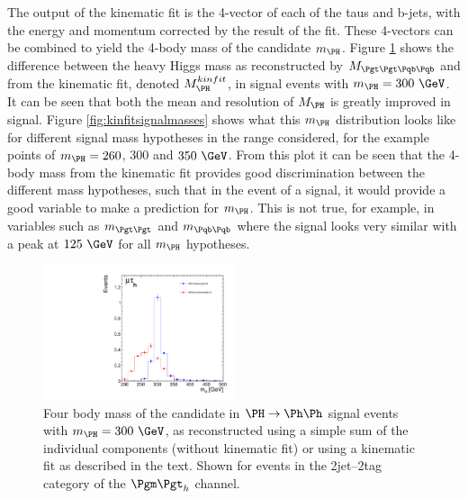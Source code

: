 The output of the kinematic fit is the 4-vector of each of the taus and b-jets,
with the energy and momentum corrected by the result of the fit. These 4-vectors
can be combined to yield the 4-body mass of the candidate $m_{\PH}$. Figure
\ref{fig:kinfitvsmttbb}
shows the difference between the heavy Higgs mass as reconstructed by
$M_{\Pgt\Pgt \Pqb\Pqb}$ and from the kinematic fit, denoted $M_{\PH}^{kinfit}$,
in signal events with $m_{\PH}=300~\GeV$. It can
be seen that both the mean and resolution of $M_{\PH}$ is greatly improved in
signal. Figure \ref{fig:kinfitsignalmasses} shows what this $m_{\PH}$
distribution looks like for different signal mass hypotheses in the range
considered, for the example points of $m_{\PH}=260$, $300$ and $350~\GeV$. From
this plot it can be seen that the 4-body mass from the kinematic fit provides
good discrimination between the different mass hypotheses, such that in the
event of a signal, it would provide a good variable to make a prediction for
$m_{\PH}$. This is not true, for example, in variables such as $m_{\Pgt\Pgt}$
and $m_{\Pqb\Pqb}$ where the signal looks very similar with a peak at $125~\GeV$
for all $m_{\PH}$ hypotheses.

\begin{figure}
\begin{center}
    \includegraphics[width=0.5\textwidth]
      {plots/Hhh/m_H_kinfit_vs_mttbb_2jet2tagSFMassCuts_mt_ggHTohh300.pdf}

\end{center}
\caption{
Four body mass of the candidate \PH in $\PH\to\Ph\Ph$ signal events with
$m_{\PH}=300~\GeV$, as reconstructed using a simple sum of the
individual components (without kinematic fit) or using a kinematic fit as
described in the text. Shown for events in the 2jet--2tag category of the
$\mutau$ channel.}
\label{fig:kinfitvsmttbb}
\end{figure} 

